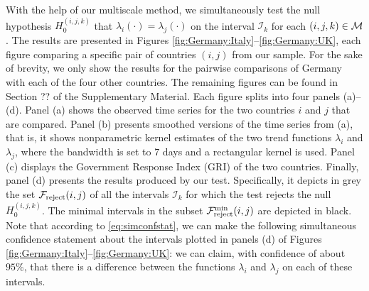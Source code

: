 \documentclass[a4paper,12pt]{article}
\numberwithin{equation}{section}
\begin{document}
With the help of our multiscale method, we simultaneously test the null hypothesis $H_0^{(i, j, k)}$ that $\lambda_i(\cdot) = \lambda_j(\cdot)$ on the interval $\mathcal{I}_k$ for each $(i, j, k) \in \mathcal{M}$. The results are presented in Figures \ref{fig:Germany:Italy}--\ref{fig:Germany:UK}, each figure comparing a specific pair of countries $(i,j)$ from our sample. For the sake of brevity, we only show the results for the pairwise comparisons of Germany with each of the four other countries. The remaining figures can be found in Section ?? of the Supplementary Material. Each figure splits into four panels (a)--(d).  Panel (a) shows the observed time series for the two countries $i$ and $j$ that are compared. Panel (b) presents smoothed versions of the time series from (a), that is, it shows nonparametric kernel estimates of the two trend functions $\lambda_i$ and $\lambda_j$, where the bandwidth is set to $7$ days and a rectangular kernel is used. Panel (c) displays the Government Response Index (GRI) of the two countries. Finally, panel (d) presents the results produced by our test. Specifically, it depicts in grey the set $\mathcal{F}_{\text{reject}}(i,j)$ of all the intervals $\mathcal{I}_k$ for which the test rejects the null $H_0^{(i, j, k)}$. The minimal intervals in the subset $\mathcal{F}_{\text{reject}}^{\text{min}}(i, j)$ are depicted in black. Note that according to \eqref{eq:simconfstat}, we can make the following simultaneous confidence statement about the intervals plotted in panels (d) of Figures \ref{fig:Germany:Italy}--\ref{fig:Germany:UK}: we can claim, with confidence of about $95\%$, that there is a difference between the functions $\lambda_i$ and $\lambda_j$ on each of these intervals.




\end{document}

